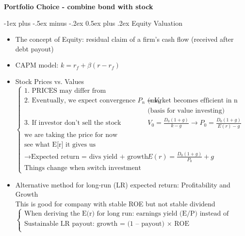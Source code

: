 \documentclass[10pt,landscape]{article}
\makeatletter
\renewcommand{\section}{\@startsection{section}{1}{0mm}%
                                {-1ex plus -.5ex minus -.2ex}%
                                {0.5ex plus .2ex}%
                                {\normalfont\large\bfseries}}
\makeatother
\begin{document}
\newpage
    \begin{center}
         \Large{\textbf{Portfolio Choice - combine bond with stock}} \\
    \end{center}

    \begin{multicols}{2}
	\setlength{\premulticols}{1pt}
	\setlength{\postmulticols}{1pt}
	\setlength{\multicolsep}{1pt}
	\setlength{\columnsep}{2pt}

    \section{Equity Valuation}
    \begin{itemize}
        \item The concept of {\color{red}Equity}: residual claim of a firm's cash flow (received after debt payout)
        \item CAPM model: $k = r_f +\beta(r-r_f)$ 
        \item Stock Prices vs. Values \\
        	$
            \begin{cases}
                \text{1. PRICES may differ from fundamental VALUES}\\
                \text{2. Eventually, we expect convergence $P_n = V_n$}& \text{(market becomes efficient in n years)}\\
                \text{}& \text{(basis for value investing)}\\
                \text{3. If investor don't sell the stock} & \displaystyle V_0=\frac{D_0(1+g)}{k-g} \rightarrow \displaystyle P_0=\frac{D_0(1+g)}{E(r)-g}\\
                \text{we are taking the price for now}\\
                \text{see what E[r] it gives us}\\
                \rightarrow \text{Expected return = divs yield + growth in divs} & \displaystyle E(r)=\frac{D_0(1+g)}{P_0}+g\\
                \text{Things change when switch investment horizon}
            \end{cases}
            $
        \item Alternative method for long-run (LR) expected return: Profitability and Growth\\
            This is good for company with stable ROE but not stable dividend\\
            $
            \begin{cases}
                \text{When deriving the E(r) for long run: earnings yield (E/P) instead of dividend yield (D/P)}\\
                \text{Sustainable LR payout: growth = (1 – payout) $\times$ ROE }\\
            \end{cases}
            $


\end{itemize}
\end{multicols}
\end{document}
